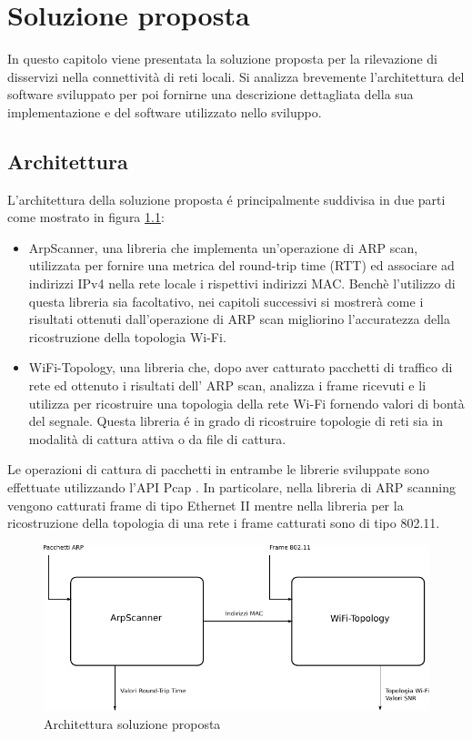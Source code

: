 \chapter{Soluzione proposta}
In questo capitolo viene presentata la soluzione proposta per la rilevazione di disservizi nella connettivit\`a di reti locali.
Si analizza brevemente l'architettura del software sviluppato per poi fornirne una descrizione dettagliata della sua implementazione e del software utilizzato nello sviluppo.

\section{Architettura}
L'architettura della soluzione proposta \'e principalmente suddivisa in due parti come mostrato in figura \ref{fig:solproposta}: %
\begin{itemize}

\item ArpScanner, una libreria che implementa un'operazione di ARP \cite{rfc826} scan, utilizzata per fornire una metrica del round-trip time (RTT) ed associare ad indirizzi IPv4 nella rete locale i rispettivi indirizzi MAC.
Bench\`e l'utilizzo di questa libreria sia facoltativo, nei capitoli successivi si mostrer\`a come i risultati ottenuti dall'operazione di ARP scan migliorino l'accuratezza della ricostruzione della topologia Wi-Fi.
\item WiFi-Topology, una libreria che, dopo aver catturato pacchetti di traffico di rete ed ottenuto i risultati dell' ARP scan, analizza i frame ricevuti e li utilizza per ricostruire una topologia della rete Wi-Fi fornendo valori di bont\`a del segnale.
Questa libreria \'e in grado di ricostruire topologie di reti sia in modalit\`a di cattura attiva o da file di cattura.
\end{itemize}

Le operazioni di cattura di pacchetti in entrambe le librerie sviluppate sono effettuate utilizzando l'API Pcap \cite{pcap}.
In particolare, nella libreria di ARP scanning vengono catturati frame di tipo Ethernet II mentre nella libreria per la ricostruzione della topologia di una rete i frame catturati sono di tipo 802.11.

\begin{figure}[!htb]
	\centering
	\includegraphics{images/drawingarchitettura.pdf}%
	\caption{Architettura soluzione proposta}
	\label{fig:solproposta}
\end{figure}


